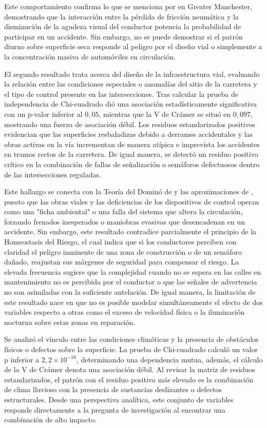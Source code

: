 \documentclass[12pt]{article}
\begin{document}
 Este comportamiento confirma lo que se menciona por \textcite{KARZAN2017} en Greater Manchester, demostrando que la interacción entre la pérdida de fricción neumática y la disminución de la agudeza visual del conductor potencia la probabilidad de participar en un accidente. Sin embargo, no se puede demostrar si el patrón diurno sobre superficie seca responde al peligro por el diseño vial o simplemente a la concentración masiva de automóviles en circulación.

 El segundo resultado trata acerca del diseño de la infraestructura vial, evaluando la relación entre las condiciones especiales o anomalías del sitio de la carretera y el tipo de control presente en las intersecciones. Tras calcular la prueba de independencia de Chi-cuadrado dió una asociación estadísticamente significativa con un p-valor inferior al $0,05$, mientras que la V de Crámer se situó en $0,097$, mostrando una fuerza de asociación débil. Los residuos estandarizados positivos evidencian que las superficies resbaladizas debido a derrames accidentales y las obras activas en la vía incrementan de manera atípica e imprevista los accidentes en tramos rectos de la carretera. De igual manera, se detectó un residuo positivo crítico en la combinación de fallas de señalización o semáforos defectuosos dentro de las intersecciones reguladas.

 Este hallazgo se conecta con la Teoría del Dominó de \textcite{SAXENA2017} y las aproximaciones de \textcite{HOSSEINIAN2012}, puesto que las obras viales y las deficiencias de los dispositivos de control operan como una "ficha ambiental" o una falla del sistema que altera la circulación, forzando frenados inesperados o maniobras evasivas que desencadenan en un accidente. Sin embargo, este resultado contradice parcialmente el principio de la Homeostasis del Riesgo, el cual indica que si los conductores perciben con claridad el peligro inminente de una zona de construcción o de un semáforo dañado, reajustan sus márgenes de seguridad para compensar el riesgo. La elevada frecuencia sugiere que la complejidad cuando no se espera en las calles en mantenimiento no es percibida por el conductor o que las señales de advertencia no son asimiladas con la suficiente antelación. De igual manera, la limitación de este resultado nace en que no es posible modelar simultáneamente el efecto de dos variables respecto a otras como el exceso de velocidad física o la iluminación nocturna sobre estas zonas en reparación.

 Se analizó el vínculo entre las condiciones climáticas y la presencia de obstáculos físicos o defectos sobre la superficie. La prueba de Chi-cuadrado calculó un valor p inferior a $2,2 \times 10^{-16}$, determinando una dependencia mutua, además, el cálculo de la V de Crámer denota una asociación débil. Al revisar la matriz de residuos estandarizados, el patrón con el residuo positivo más elevado es la combinación de clima lluvioso con la presencia de sustancias deslizantes o defectos estructurales. Desde una perspectiva analítica, este conjunto de variables responde directamente a la pregunta de investigación al encontrar una combinación de alto impacto.
\end{document}
